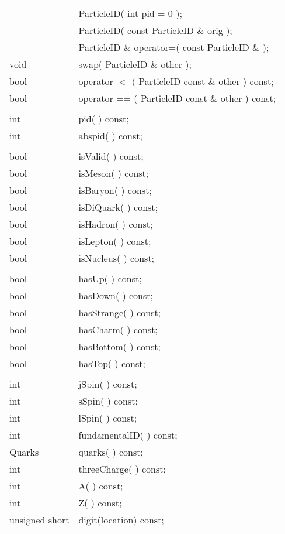 \begin{center}
\begin{tabular}{ll}
 & ParticleID( int pid = 0 ); \\
 & ParticleID( const ParticleID \& orig );  \\
 & ParticleID \& operator=( const ParticleID \& );  \\
void & swap( ParticleID \& other );  \\
bool  & operator $<$  ( ParticleID const \& other ) const;  \\
bool   &operator == ( ParticleID const \& other ) const;  \\
 \\
int   &  pid( )        const;  \\
int & abspid( )        const;  \\
 \\
bool & isValid( )   const; \\
bool & isMeson( )   const;\\
bool  & isBaryon( )  const;\\
bool  & isDiQuark( ) const;\\
bool & isHadron( )  const; \\
bool & isLepton( )  const; \\
bool & isNucleus( )  const; \\
 \\
bool & hasUp( )      const; \\
bool & hasDown( )    const;\\
bool & hasStrange( ) const;\\
bool & hasCharm( )   const;\\
bool & hasBottom( )  const;\\
bool & hasTop( )     const;\\
 \\
int  & jSpin( )        const; \\
int  & sSpin( )        const;\\
int  & lSpin( )        const; \\
int & fundamentalID( ) const; \\
Quarks & quarks( ) const; \\
int & threeCharge( ) const; \\
int & A( ) const;\\
int & Z( ) const;\\
unsigned short & digit(location) const; \\
\end{tabular}
\end{center}

